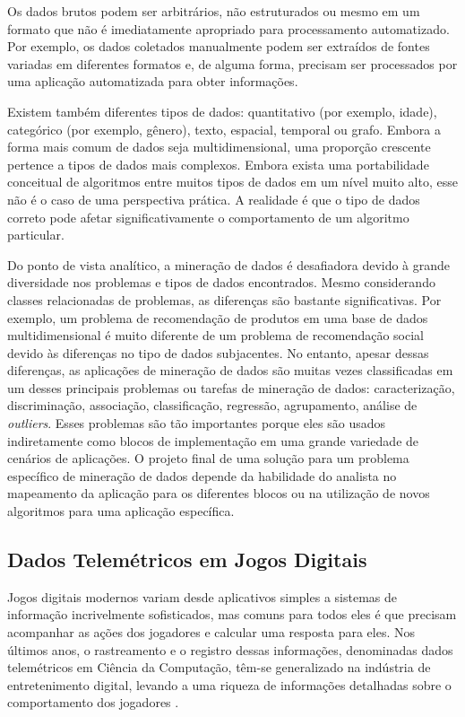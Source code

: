 Os dados brutos podem ser arbitrários, não estruturados ou mesmo em um formato que não é imediatamente apropriado para processamento automatizado. Por exemplo, os dados coletados manualmente podem ser extraídos de fontes variadas em diferentes formatos e, de alguma forma, precisam ser processados por uma aplicação automatizada para obter informações.

Existem também diferentes tipos de dados: quantitativo (por exemplo, idade), categórico (por exemplo, gênero), texto, espacial, temporal ou grafo. Embora a forma mais comum de dados seja multidimensional, uma proporção crescente pertence a tipos de dados mais complexos. Embora exista uma portabilidade conceitual de algoritmos entre muitos tipos de dados em um nível muito alto, esse não é o caso de uma perspectiva prática. A realidade é que o tipo de dados correto pode afetar significativamente o comportamento de um algoritmo particular.

Do ponto de vista analítico, a mineração de dados é desafiadora devido à grande diversidade nos problemas e tipos de dados encontrados. Mesmo considerando classes relacionadas de problemas, as diferenças são bastante significativas. Por exemplo, um problema de recomendação de produtos em uma base de dados multidimensional é muito diferente de um problema de recomendação social devido às diferenças no tipo de dados subjacentes. No entanto, apesar dessas diferenças, as aplicações de mineração de dados são muitas vezes classificadas em um desses principais problemas ou tarefas de mineração de dados: caracterização, discriminação, associação, classificação, regressão, agrupamento, análise de \textit{outliers}. Esses problemas são tão importantes porque eles são usados indiretamente como blocos de implementação em uma grande variedade de cenários de aplicações. O projeto final de uma solução para um problema específico de mineração de dados depende da habilidade do analista no mapeamento da aplicação para os diferentes blocos ou na utilização de novos algoritmos para uma aplicação específica.

\subsection{Dados Telemétricos em Jogos Digitais}
Jogos digitais modernos variam desde aplicativos simples a sistemas de informação incrivelmente sofisticados, mas comuns para todos eles é que precisam acompanhar as ações dos jogadores e calcular uma resposta para eles. Nos últimos anos, o rastreamento e o registro dessas informações, denominadas dados telemétricos em Ciência da Computação, têm-se generalizado na indústria de entretenimento digital, levando a uma riqueza de informações detalhadas sobre o comportamento dos jogadores \cite{el2016game}.

